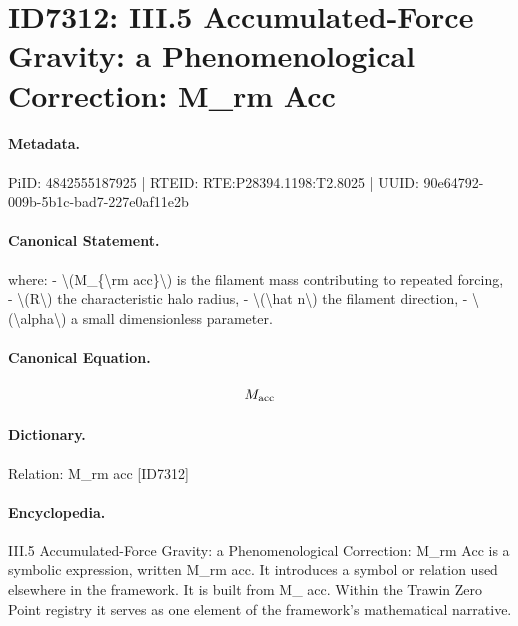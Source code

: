 \section*{ID7312: III.5 Accumulated-Force Gravity: a Phenomenological Correction: M\_rm Acc}
\paragraph{Metadata.}
PiID: 4842555187925 | RTEID: RTE:P28394.1198:T2.8025 | UUID: 90e64792-009b-5b1c-bad7-227e0af11e2b

\paragraph{Canonical Statement.}
where: - \textbackslash{}(M\_\{\textbackslash{}rm acc\}\textbackslash{}) is the filament mass contributing to repeated forcing, - \textbackslash{}(R\textbackslash{}) the characteristic halo radius, - \textbackslash{}(\textbackslash{}hat n\textbackslash{}) the filament direction, - \textbackslash{}(\textbackslash{}alpha\textbackslash{}) a small dimensionless parameter.

\paragraph{Canonical Equation.}
\[
M_{\rm acc}
\]

\paragraph{Dictionary.}
Relation: M\_rm acc [ID7312]

\paragraph{Encyclopedia.}
III.5 Accumulated-Force Gravity: a Phenomenological Correction: M\_rm Acc is a symbolic expression, written M\_rm acc. It introduces a symbol or relation used elsewhere in the framework. It is built from M\_ acc. Within the Trawin Zero Point registry it serves as one element of the framework's mathematical narrative.
